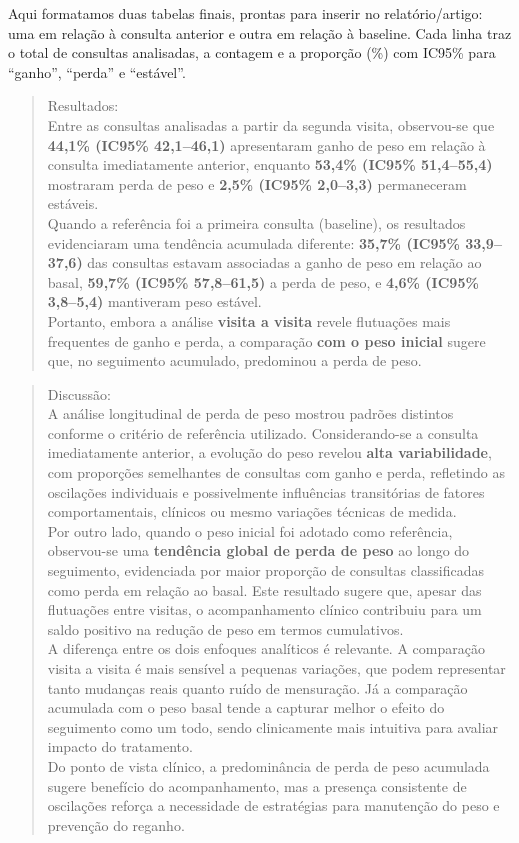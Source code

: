 \documentclass[
]{article}
\begin{document}
Aqui formatamos duas tabelas finais, prontas para inserir no
relatório/artigo: uma em relação à consulta anterior e outra em relação
à baseline. Cada linha traz o total de consultas analisadas, a contagem
e a proporção (\%) com IC95\% para ``ganho'', ``perda'' e ``estável''.

\begin{quote}
Resultados:\\
Entre as consultas analisadas a partir da segunda visita, observou-se
que \textbf{44,1\% (IC95\% 42,1--46,1)} apresentaram ganho de peso em
relação à consulta imediatamente anterior, enquanto \textbf{53,4\%
(IC95\% 51,4--55,4)} mostraram perda de peso e \textbf{2,5\% (IC95\%
2,0--3,3)} permaneceram estáveis.\\
Quando a referência foi a primeira consulta (baseline), os resultados
evidenciaram uma tendência acumulada diferente: \textbf{35,7\% (IC95\%
33,9--37,6)} das consultas estavam associadas a ganho de peso em relação
ao basal, \textbf{59,7\% (IC95\% 57,8--61,5)} a perda de peso, e
\textbf{4,6\% (IC95\% 3,8--5,4)} mantiveram peso estável.\\
Portanto, embora a análise \textbf{visita a visita} revele flutuações
mais frequentes de ganho e perda, a comparação \textbf{com o peso
inicial} sugere que, no seguimento acumulado, predominou a perda de
peso.\\
\end{quote}

\begin{quote}
Discussão:\\
A análise longitudinal de perda de peso mostrou padrões distintos
conforme o critério de referência utilizado. Considerando-se a consulta
imediatamente anterior, a evolução do peso revelou \textbf{alta
variabilidade}, com proporções semelhantes de consultas com ganho e
perda, refletindo as oscilações individuais e possivelmente influências
transitórias de fatores comportamentais, clínicos ou mesmo variações
técnicas de medida.\\
Por outro lado, quando o peso inicial foi adotado como referência,
observou-se uma \textbf{tendência global de perda de peso} ao longo do
seguimento, evidenciada por maior proporção de consultas classificadas
como perda em relação ao basal. Este resultado sugere que, apesar das
flutuações entre visitas, o acompanhamento clínico contribuiu para um
saldo positivo na redução de peso em termos cumulativos.\\
A diferença entre os dois enfoques analíticos é relevante. A comparação
visita a visita é mais sensível a pequenas variações, que podem
representar tanto mudanças reais quanto ruído de mensuração. Já a
comparação acumulada com o peso basal tende a capturar melhor o efeito
do seguimento como um todo, sendo clinicamente mais intuitiva para
avaliar impacto do tratamento.\\
Do ponto de vista clínico, a predominância de perda de peso acumulada
sugere benefício do acompanhamento, mas a presença consistente de
oscilações reforça a necessidade de estratégias para manutenção do peso
e prevenção do reganho.
\end{quote}
\end{document}

